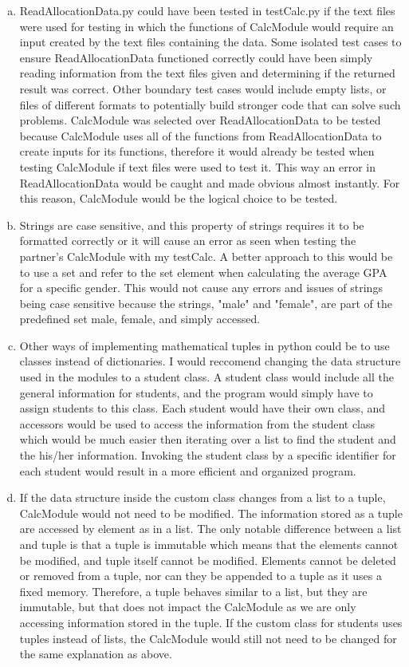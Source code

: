 \documentclass[12pt]{article}
\begin{document}
\begin{enumerate}[(a)]
\item ReadAllocationData.py could have been tested in testCalc.py if the text files were used for testing in which the functions of CalcModule would 
require an input created by the text files containing the data. Some isolated test cases to ensure ReadAllocationData functioned correctly could 
have been simply reading information from the text files given and determining if the returned result was correct. Other boundary test cases would 
include empty lists, or files of different formats to potentially build stronger code that can solve such problems. CalcModule was selected over 
ReadAllocationData to be tested because CalcModule uses all of the functions from ReadAllocationData to create inputs for its functions, therefore it 
would already be tested when testing CalcModule if text files were used to test it. This way an error in ReadAllocationData would be caught and made 
obvious almost instantly. For this reason, CalcModule would be the logical choice to be tested.

\item Strings are case sensitive, and this property of strings requires it to be formatted correctly or it will cause an error as seen when testing 
the partner's CalcModule with my testCalc. A better approach to this would be to use a set and refer to the set element when calculating the average 
GPA for a specific gender. This would not cause any errors and issues of strings being case sensitive because the strings, "male" and "female", are part
of the predefined set {male, female}, and simply accessed.

\item Other ways of implementing mathematical tuples in python could be to use classes instead of dictionaries. I would reccomend changing the 
data structure used in the modules to a student class. A student class would include all the general information for students, and the program would
simply have to assign students to this class. Each student would have their own class, and accessors would be used to access the information from the 
student class which would be much easier then iterating over a list to find the student and the his/her information. Invoking the student class by a 
specific identifier for each student would result in a more efficient and organized program. 

\item If the data structure inside the custom class changes from a list to a tuple, CalcModule would not need to be modified. The information stored as
a tuple are accessed by element as in a list. The only notable difference between a list and tuple is that a tuple is immutable which means that the elements
cannot be modified, and tuple itself cannot be modified. Elements cannot be deleted or removed from a tuple, nor can they be appended to a tuple as it uses
a fixed memory. Therefore, a tuple behaves similar to a list, but they are immutable, but that does not impact the CalcModule as we are only accessing
information stored in the tuple. If the custom class for students uses tuples instead of lists, the CalcModule would still not need to be changed for the same
explanation as above.


\end{enumerate}
\end{document}
